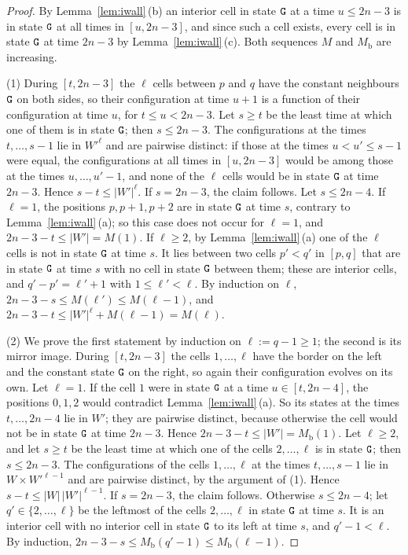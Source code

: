 \documentclass[11pt]{article}
\theoremstyle{remark}
\begin{document}
\begin{proof}
By Lemma~\ref{lem:iwall}\,(b) an interior cell in state $\mathtt{G}$ at a time $u\le 2n-3$ is in state $\mathtt{G}$ at all
times in $[u,2n-3]$, and since such a cell exists, every cell is in state $\mathtt{G}$ at time $2n-3$ by
Lemma~\ref{lem:iwall}\,(c). Both sequences $M$ and $M_{\mathrm b}$ are increasing.

(1) During $[t,2n-3]$ the $\ell$ cells between $p$ and $q$ have the constant neighbours $\mathtt{G}$ on both sides, so
their configuration at time $u+1$ is a function of their configuration at time $u$, for $t\le u<2n-3$. Let
$s\ge t$ be the least time at which one of them is in state $\mathtt{G}$; then $s\le2n-3$. The configurations at the
times $t,\dots,s-1$ lie in $W'^{\ell}$ and are pairwise distinct: if those at the times $u<u'\le s-1$ were
equal, the configurations at all times in $[u,2n-3]$ would be among those at the times $u,\dots,u'-1$, and
none of the $\ell$ cells would be in state $\mathtt{G}$ at time $2n-3$. Hence $s-t\le|W'|^{\ell}$. If $s=2n-3$, the
claim follows. Let $s\le2n-4$. If $\ell=1$, the positions $p,p+1,p+2$ are in state $\mathtt{G}$ at time $s$,
contrary to Lemma~\ref{lem:iwall}\,(a); so this case does not occur for $\ell=1$, and $2n-3-t\le|W'|=M(1)$. If
$\ell\ge2$, by Lemma~\ref{lem:iwall}\,(a) one of the $\ell$ cells is not in state $\mathtt{G}$ at time $s$. It lies
between two cells $p'<q'$ in $[p,q]$ that are in state $\mathtt{G}$ at time $s$ with no cell in state $\mathtt{G}$ between
them; these are interior cells, and $q'-p'=\ell'+1$ with $1\le\ell'<\ell$. By induction on $\ell$,
$2n-3-s\le M(\ell')\le M(\ell-1)$, and $2n-3-t\le|W'|^{\ell}+M(\ell-1)=M(\ell)$.

(2) We prove the first statement by induction on $\ell:=q-1\ge1$; the second is its mirror image. During
$[t,2n-3]$ the cells $1,\dots,\ell$ have the border on the left and the constant state $\mathtt{G}$ on the right, so
again their configuration evolves on its own. Let $\ell=1$. If the cell $1$ were in state $\mathtt{G}$ at a time
$u\in[t,2n-4]$, the positions $0,1,2$ would contradict Lemma~\ref{lem:iwall}\,(a). So its states at the times
$t,\dots,2n-4$ lie in $W'$; they are pairwise distinct, because otherwise the cell would not be in state
$\mathtt{G}$ at time $2n-3$. Hence $2n-3-t\le|W'|=M_{\mathrm b}(1)$. Let $\ell\ge2$, and let $s\ge t$ be the least
time at which one of the cells $2,\dots,\ell$ is in state $\mathtt{G}$; then $s\le2n-3$. The configurations of the
cells $1,\dots,\ell$ at the times $t,\dots,s-1$ lie in $W\times W'^{\ell-1}$ and are pairwise distinct, by the
argument of (1). Hence $s-t\le|W|\,|W'|^{\ell-1}$. If $s=2n-3$, the claim follows. Otherwise $s\le 2n-4$; let
$q'\in\{2,\dots,\ell\}$ be the leftmost of the cells $2,\dots,\ell$ in state $\mathtt{G}$ at time $s$. It is an
interior cell with no interior cell in state $\mathtt{G}$ to its left at time $s$, and $q'-1<\ell$. By induction,
$2n-3-s\le M_{\mathrm b}(q'-1)\le M_{\mathrm b}(\ell-1)$.
\end{proof}
\end{document}
